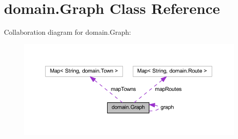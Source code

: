 \hypertarget{classdomain_1_1_graph}{}\section{domain.\+Graph Class Reference}
\label{classdomain_1_1_graph}


Collaboration diagram for domain.\+Graph\+:\nopagebreak
\begin{figure}[H]
\begin{center}
\leavevmode
\includegraphics[width=350pt]{classdomain_1_1_graph__coll__graph}
\end{center}
\end{figure}
